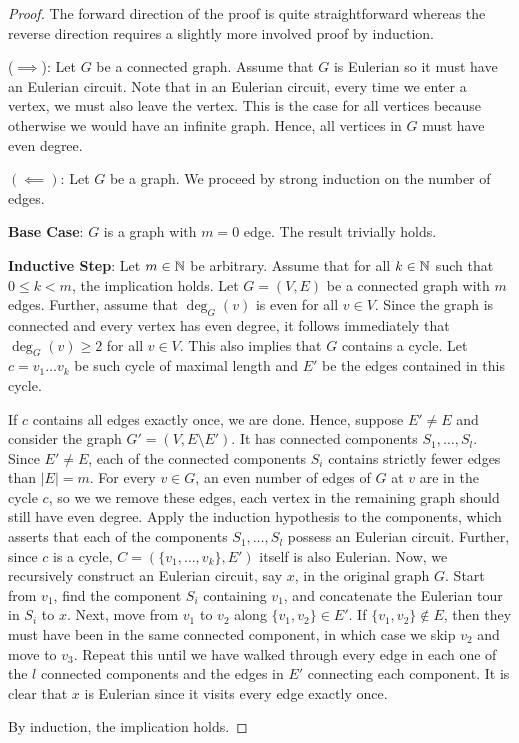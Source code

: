 \begin{proof}
    The forward direction of the proof is quite straightforward whereas the reverse direction requires a slightly more involved proof by induction.

    ($\implies$): Let $G$ be a connected graph. Assume that $G$ is Eulerian so it must have an Eulerian circuit. Note that in an Eulerian circuit, every time we enter a vertex, we must also leave the vertex. This is the case for all vertices because otherwise we would have an infinite graph. Hence, all vertices in $G$ must have even degree.

    $(\impliedby)$: Let $G$ be a graph. We proceed by strong induction on the number of edges.

    \textbf{Base Case}: $G$ is a graph with $m = 0$ edge. The result trivially holds.

    \textbf{Inductive Step}: Let $m \in \mathbb{N}$ be arbitrary. Assume that for all $k \in \mathbb{N}$ such that $0 \leq k < m$, the implication holds. Let $G = (V,E)$ be a connected graph with $m$ edges. Further, assume that $\deg_G(v)$ is even for all $v \in V$. Since the graph is connected and every vertex has even degree, it follows immediately that $\deg_G(v) \geq 2$ for all $v \in V$. This also implies that $G$ contains a cycle. Let $c = v_1\ldots v_k$ be such cycle of maximal length and $E'$ be the edges contained in this cycle.

    If $c$ contains all edges exactly once, we are done. Hence, suppose $E' \neq E$ and consider the graph $G' = (V, E \setminus E')$. It has connected components $S_1, \ldots, S_l$. Since $E' \neq E$, each of the connected components $S_i$ contains strictly fewer edges than $|E| = m$. For every $v \in G$, an even number of edges of $G$ at $v$ are in the cycle $c$, so we we remove these edges, each vertex in the remaining graph should still have even degree. Apply the induction hypothesis to the components, which asserts that each of the components $S_1, \ldots, S_l$ possess an Eulerian circuit. Further, since $c$ is a cycle, $C = (\{v_1,\ldots,v_k\}, E')$ itself is also Eulerian. Now, we recursively construct an Eulerian circuit, say $x$, in the original graph $G$. Start from $v_1$, find the component $S_i$ containing $v_1$, and concatenate the Eulerian tour in $S_i$ to $x$. Next, move from $v_1$ to $v_2$ along $\{v_1,v_2\} \in E'$. If $\{v_1,v_2\} \not\in E$, then they must have been in the same connected component, in which case we skip $v_2$ and move to $v_3$. Repeat this until we have walked through every edge in each one of the $l$ connected components and the edges in $E'$ connecting each component. It is clear that $x$ is Eulerian since it visits every edge exactly once.

    By induction, the implication holds.
\end{proof}

